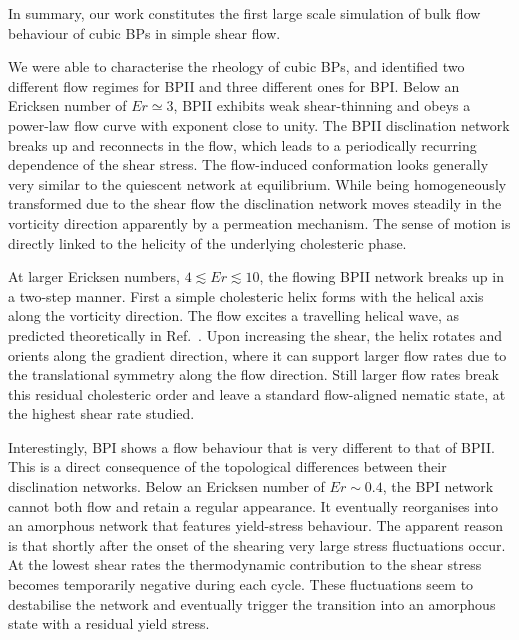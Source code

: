 \documentclass[8.5pt,twoside,twocolumn]{article}
\begin{document}
In summary, our work constitutes the first large scale simulation of bulk flow behaviour 
of cubic BPs in simple shear flow. 
  
We were able to characterise the rheology of cubic BPs, and identified 
two different flow regimes for BPII and three different ones for BPI. 
Below an Ericksen number of $Er\simeq3$, BPII exhibits weak shear-thinning and 
obeys a power-law flow curve with exponent close to unity.  
The BPII disclination network breaks up and reconnects 
in the flow, which leads to a periodically recurring dependence 
of the shear stress. The flow-induced conformation looks generally
very similar to the quiescent network at equilibrium. 
While being homogeneously transformed due to the shear flow
the disclination network moves steadily in the vorticity direction
apparently by a permeation mechanism. The sense of
motion is directly linked to the helicity of the underlying cholesteric phase.

At larger Ericksen numbers, $4\lesssim Er\lesssim 10$, the flowing BPII network 
breaks up in a two-step manner. First a simple cholesteric helix forms with the helical axis 
along the vorticity direction. The flow excites a travelling helical wave,
as predicted theoretically in Ref.~\cite{Rey:1996a,Rey:1996b}.
Upon increasing the shear, the helix rotates and orients along the
gradient direction, where it can support larger flow rates due to the translational
symmetry along the flow direction. Still larger flow rates break this residual
cholesteric order and leave a standard flow-aligned nematic state,
at the highest shear rate studied.

Interestingly, BPI shows a flow behaviour that is very different to that of BPII.
This is a direct consequence of the topological differences between their disclination 
networks. Below an Ericksen number of $Er\sim 0.4$, the BPI network cannot both flow and 
retain a regular appearance. It eventually reorganises into an amorphous network that
features yield-stress behaviour. The apparent reason is that shortly after the onset of the shearing 
very large stress fluctuations occur. At the lowest shear rates
the thermodynamic contribution to the shear stress becomes temporarily 
negative during each cycle. These fluctuations seem to destabilise the network and 
eventually trigger the transition into an amorphous state with a residual yield
stress. 
\end{document}
